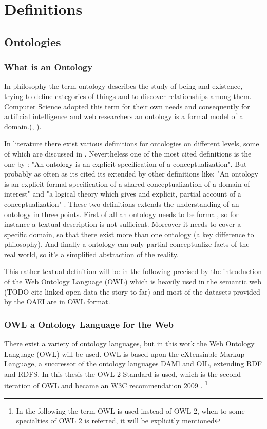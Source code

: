 \documentclass[11pt,titlepage,oneside,openany,a4paper]{report}
\begin{document}
	\section{Definitions}
	\label{sec:defintions}

	\subsection{Ontologies}
	\label{sec:ontologies_def}
	\subsubsection{What is an Ontology}
In philosophy the term ontology describes the study of being and existence, trying to define categories of things and to discover relationships among them. Computer Science adopted this term for their own needs and consequently for artificial intelligence  and web researchers an ontology is a formal model of a domain.(\cite{ehrig2006ontology}, \cite{paulheim2011ontology}). 

In literature there exist various definitions for ontologies on different levels, some of which are discussed in \cite{Guarino:1997}. Nevertheless one of the most cited definitions is the one by \cite{Gruber:1995}: "An ontology is an explicit specification of a conceptualization".  But probably as often as its cited its extended by other definitions like: "An ontology is an explicit formal specification of a shared conceptualization of a domain of interest"\cite{Studer:1998} and "a logical theory which gives and explicit, partial account of a conceptualization" \cite{Guarino95}. These two definitions extends the understanding of an ontology in three points. First of all an ontology needs to be formal, so for instance a textual description is not sufficient.\cite{Studer:1998} Moreover it needs to cover a specific domain, so that there exist more than one ontology (a key difference to philosophy). And finally a ontology can only partial conceptualize facts of the real world, so it's a simplified abstraction of the reality.\cite{ehrig2006ontology}

This rather textual definition will be in the following precised by the introduction of the Web Ontology Language (OWL) which is  heavily used in the semantic web (TODO cite linked open data the story to far) and most of the datasets provided by the OAEI are in OWL format. \cite{dragisicresults}
\subsubsection{OWL a Ontology Language for the Web}
There exist a variety of ontology languages, but in this work the Web Ontology Language (OWL) will be used. OWL is based upon the eXtensinble Markup Language, a succressor of the ontology languages DAMl and OIL, extending RDF and RDFS. In this thesis the OWL 2 Standard is used, which is the second iteration of OWL and became an W3C recommendation 2009 \cite{OWL2a}. \footnote{In the following the term OWL is used instead of OWL 2, when to some specialties of OWL 2 is referred, it will be explicitly mentioned}
\end{document}

